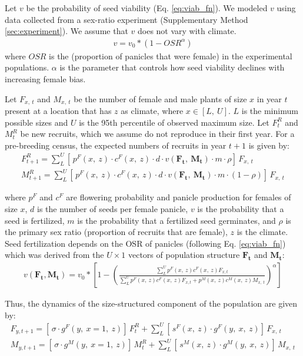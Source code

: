 \documentclass[12pt]{article}
\begin{document}
Let $v$ be the probability of seed viability (Eq. \ref{eq:viab_fn}). 
We modeled  $v$ using data collected from a sex-ratio experiment (Supplementary Method \ref{sec:experiment}).
We assume that $v$ does not vary with climate.  
\begin{align}\label{eq:viab_fn}
v = v_{0} * (1 - OSR^{\alpha})
\end{align}
\noindent where $OSR$ is the (proportion of panicles that were female) in the experimental populations.
$\alpha$ is the parameter that controls how seed viability declines with increasing female bias.

Let $F_{x,\ t}$ and $M_{x,\ t}$ be the number of female and male plants of size $x$ in year $t$ present at a location that has $z$ as climate, where $x \in [L,\ U]$.
$L$ is the minimum possible sizes and $U$ is the 95th percentile of observed maximum size.
Let $F^{R}_{t}$ and $M^{R}_{t}$ be new recruits, which we assume do not reproduce in their first year.
For a pre-breeding census, the expected numbers of recruits in year $t+1$ is given by:
\begin{align}\label{eq:recruits}
F^{R}_{t+1} = \sum_{L}^{U} 	[ \, p^{F}(x,\ z) \cdot c^{F}(x,\ z) \cdot d \cdot v(\mathbf{F_{t}},\ \mathbf{M_{t}}) \cdot m \cdot \rho 	] \, F_{x,\ t}
\\
M^{R}_{t+1} = \sum_{L}^{U} 	[ \, p^{F}(x,\ z) \cdot c^{F}(x,\ z) \cdot d \cdot v(\mathbf{F_{t}},\ \mathbf{M_{t}}) \cdot m \cdot (1-\rho) 	] \, F_{x,\ t}
\end{align}

\noindent where $p^{F}$ and $c^{F}$ are flowering probability and panicle production for females of size $x$, $d$ is the number of seeds per female panicle, $v$ is the probability that a seed is fertilized, $m$ is the probability that a fertilized seed germinates, and $\rho$ is the primary sex ratio (proportion of recruits that are female), $z$ is the climate. 
Seed fertilization depends on the OSR of panicles (following Eq. \ref{eq:viab_fn}) which was derived from the $U \times 1$ vectors of population structure $\mathbf{F_{t}}$ and $\mathbf{M_{t}}$:
\begin{align}\label{eq:viab_MPM}
v(\mathbf{F_{t}},\mathbf{M_{t}}) = v_{0} * \left[ 1 - \left( \frac{\sum_{L}^{U} p^{F}(x,\ z) c^{F}(x,\ z) F_{x,t}}{\sum_{L}^{U} p^{F}(x,\ z) c^{F}(x,\ z) F_{x,t} + p^{M}(x,\ z) c^{M}(x,\ z) M_{x,\ t}} \right) ^{\alpha}\right]
\end{align}

Thus, the dynamics of the size-structured component of the population are given by:
\begin{align}\label{eq:dynamics}
F_{y,t+1} = [ \, \sigma \cdot g^{F}(y,\ x=1,\ z) ] \, F^{R}_{t} + \sum_{L}^{U} 	[ \, s^{F}(x,\ z) \cdot g^{F}(y,\ x,\ z)] \, F_{x,\ t}
\\
M_{y,t+1} = [ \, \sigma \cdot g^{M}(y,\ x=1,\ z) ] \, M^{R}_{t} + \sum_{L}^{U} 	[ \,  s^{M}(x,\ z) \cdot g^{M}(y,\ x,\ z) ] \, M_{x,\ t}
\end{align}
\end{document}
